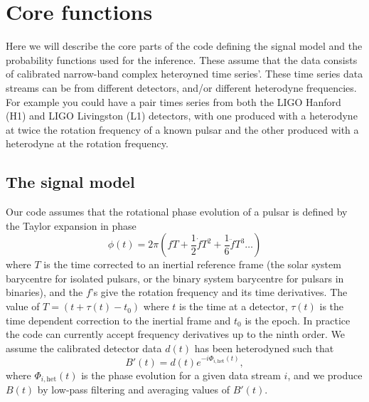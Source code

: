 \section{Core functions}

Here we will describe the core parts of the code defining the signal model and the probability functions used
for the inference. These assume that the data consists of calibrated narrow-band complex heteroyned time
series'. These time series data streams can be from different detectors, and/or different heterodyne
frequencies. For example you could have a pair times series from both the LIGO Hanford (H1) and LIGO
Livingston (L1) detectors, with one produced with a heterodyne at twice the rotation frequency of a known
pulsar and the other produced with a heterodyne at the rotation frequency.

\subsection{The signal model}\label{sec:model}

Our code assumes that the rotational phase evolution of a pulsar is defined by the Taylor expansion in phase
\begin{equation}
\phi(t) = 2\pi\left(fT + \frac{1}{2}\dot{f}T^2 + \frac{1}{6}\ddot{f}T^3 \ldots \right)
\end{equation}
where $T$ is the time corrected to an inertial reference frame (the solar system barycentre
for isolated pulsars, or the binary system barycentre for pulsars in binaries), and the $f$'s give
the rotation frequency and its time derivatives. The value of $T = (t+\tau(t)-t_0)$ where $t$ is the
time at a detector, $\tau(t)$ is the time dependent correction to the inertial frame and $t_0$ is the epoch.
In practice the code can currently accept frequency derivatives up to the ninth order. We assume the
calibrated detector data $d(t)$ has been heterodyned such that
\begin{equation}
B'(t) = d(t)e^{-i\Phi_{i,\text{het}}(t)},
\end{equation}
where $\Phi_{i,\text{het}}(t)$ is the phase evolution for a given data stream $i$, and we produce $B(t)$ by
low-pass filtering and averaging values of $B'(t)$.

